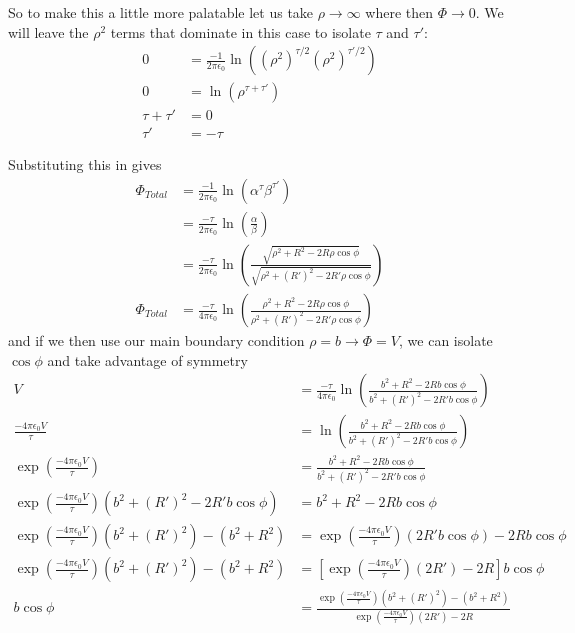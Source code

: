 \documentclass{article}
\begin{document}
So to make this a little more palatable let us take $\rho\to\infty$ where then $\Phi\to 0$. We will leave the $\rho^{2}$ terms that dominate in this case to isolate $\tau$ and $\tau'$:
\begin{align*}
0 &= \frac{-1}{2\pi\epsilon_{0}}\ln((\rho^{2})^{\tau/2}(\rho^{2})^{\tau'/2})\\
0 &= \ln(\rho^{\tau+\tau'})\\
\tau+\tau' &= 0\\
\tau' &= \boxed{-\tau}
\end{align*}

Substituting this in gives
\begin{align*}
\Phi_{Total} &= \frac{-1}{2\pi\epsilon_{0}} \ln(\alpha^{\tau}\beta^{\tau'})\\
&= \frac{-\tau}{2\pi\epsilon_{0}} \ln\left(\frac{\alpha}{\beta}\right)\\
&= \frac{-\tau}{2\pi\epsilon_{0}} \ln\left(\frac{\sqrt{\rho^{2} + R^{2} - 2R\rho\cos\phi}}{\sqrt{\rho^{2} + (R')^{2} - 2R'\rho\cos\phi}}\right)\\
\Phi_{Total} &= \frac{-\tau}{4\pi\epsilon_{0}}\ln\left(\frac{\rho^{2} + R^{2} - 2R\rho\cos\phi}{\rho^{2} + (R')^{2} - 2R'\rho\cos\phi}\right)
\end{align*}
and if we then use our main boundary condition $\rho=b\to\Phi=V$, we can isolate $\cos\phi$ and take advantage of symmetry
\begin{align*}
V &= \frac{-\tau}{4\pi\epsilon_{0}}\ln\left(\frac{b^{2} + R^{2} - 2Rb\cos\phi}{b^{2} + (R')^{2} - 2R'b\cos\phi}\right)\\
\frac{-4\pi\epsilon_{0}V}{\tau} &= \ln\left(\frac{b^{2} + R^{2} - 2Rb\cos\phi}{b^{2} + (R')^{2} - 2R'b\cos\phi}\right)\\
\exp\left(\frac{-4\pi\epsilon_{0}V}{\tau}\right) &= \frac{b^{2} + R^{2} - 2Rb\cos\phi}{b^{2} + (R')^{2} - 2R'b\cos\phi}\\
\exp\left(\frac{-4\pi\epsilon_{0}V}{\tau}\right)(b^{2} + (R')^{2} - 2R'b\cos\phi) &= b^{2} + R^{2} - 2Rb\cos\phi\\
\exp\left(\frac{-4\pi\epsilon_{0}V}{\tau}\right)(b^{2} + (R')^{2}) - (b^{2} + R^{2}) &= \exp\left(\frac{-4\pi\epsilon_{0}V}{\tau}\right)(2R'b\cos\phi) - 2Rb\cos\phi\\
\exp\left(\frac{-4\pi\epsilon_{0}V}{\tau}\right)(b^{2} + (R')^{2}) - (b^{2} + R^{2}) &= \left[\exp\left(\frac{-4\pi\epsilon_{0}V}{\tau}\right)(2R') - 2R\right]b\cos\phi\\
b\cos\phi &= \frac{\exp\left(\frac{-4\pi\epsilon_{0}V}{\tau}\right)(b^{2} + (R')^{2}) - (b^{2} + R^{2})}{\exp\left(\frac{-4\pi\epsilon_{0}V}{\tau}\right)(2R') - 2R} 
\end{align*}
\end{document}
